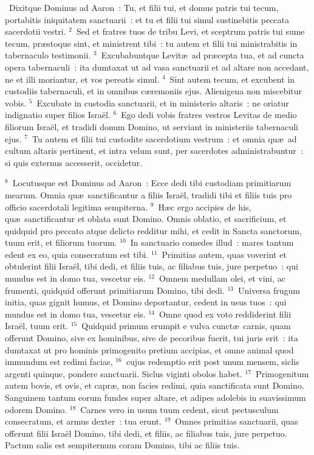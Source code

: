 ~Dixitque Dominus ad Aaron~: Tu, et filii tui, et domus patris tui tecum, portabitis iniquitatem sanctuarii~: et tu et filii tui simul sustinebitis peccata sacerdotii vestri.
${}^{2}$~Sed et fratres tuos de tribu Levi, et sceptrum patris tui sume tecum, pr\ae stoque sint, et ministrent tibi~: tu autem et filii tui ministrabitis in tabernaculo testimonii.
${}^{3}$~Excubabuntque Levit\ae\ ad pr\ae cepta tua, et ad cuncta opera tabernaculi~: ita dumtaxat ut ad vasa sanctuarii et ad altare non accedant, ne et illi moriantur, et vos pereatis simul.
${}^{4}$~Sint autem tecum, et excubent in custodiis tabernaculi, et in omnibus c\ae remoniis ejus. Alienigena non miscebitur vobis.
${}^{5}$~Excubate in custodia sanctuarii, et in ministerio altaris~: ne oriatur indignatio super filios Isra\"el.
${}^{6}$~Ego dedi vobis fratres vestros Levitas de medio filiorum Isra\"el, et tradidi donum Domino, ut serviant in ministeriis tabernaculi ejus.
${}^{7}$~Tu autem et filii tui custodite sacerdotium vestrum~: et omnia qu\ae\ ad cultum altaris pertinent, et intra velum sunt, per sacerdotes administrabuntur~: si quis externus accesserit, occidetur.


${}^{8}$~Locutusque est Dominus ad Aaron~: Ecce dedi tibi custodiam primitiarum mearum. Omnia qu\ae\ sanctificantur a filiis Isra\"el, tradidi tibi et filiis tuis pro officio sacerdotali legitima sempiterna.
${}^{9}$~H\ae c ergo accipies de his, qu\ae\ sanctificantur et oblata sunt Domino. Omnis oblatio, et sacrificium, et quidquid pro peccato atque delicto redditur mihi, et cedit in Sancta sanctorum, tuum erit, et filiorum tuorum.
${}^{10}$~In sanctuario comedes illud~: mares tantum edent ex eo, quia consecratum est tibi.
${}^{11}$~Primitias autem, quas voverint et obtulerint filii Isra\"el, tibi dedi, et filiis tuis, ac filiabus tuis, jure perpetuo~: qui mundus est in domo tua, vescetur eis.
${}^{12}$~Omnem medullam olei, et vini, ac frumenti, quidquid offerunt primitiarum Domino, tibi dedi.
${}^{13}$~Universa frugum initia, quas gignit humus, et Domino deportantur, cedent in usus tuos~: qui mundus est in domo tua, vescetur eis.
${}^{14}$~Omne quod ex voto reddiderint filii Isra\"el, tuum erit.
${}^{15}$~Quidquid primum erumpit e vulva cunct\ae\ carnis, quam offerunt Domino, sive ex hominibus, sive de pecoribus fuerit, tui juris erit~: ita dumtaxat ut pro hominis primogenito pretium accipias, et omne animal quod immundum est redimi facias,
${}^{16}$~cujus redemptio erit post unum mensem, siclis argenti quinque, pondere sanctuarii. Siclus viginti obolos habet.
${}^{17}$~Primogenitum autem bovis, et ovis, et capr\ae , non facies redimi, quia sanctificata sunt Domino. Sanguinem tantum eorum fundes super altare, et adipes adolebis in suavissimum odorem Domino.
${}^{18}$~Carnes vero in usum tuum cedent, sicut pectusculum consecratum, et armus dexter~: tua erunt.
${}^{19}$~Omnes primitias sanctuarii, quas offerunt filii Isra\"el Domino, tibi dedi, et filiis, ac filiabus tuis, jure perpetuo. Pactum salis est sempiternum coram Domino, tibi ac filiis tuis.


